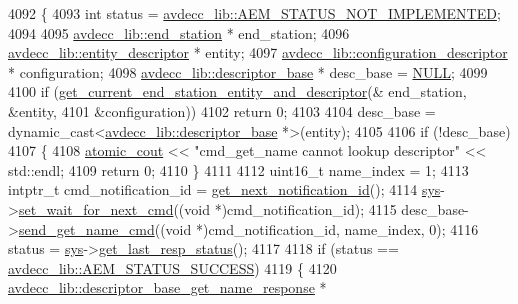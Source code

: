 \begin{DoxyCode}
4092 \{
4093     \textcolor{keywordtype}{int} status = \hyperlink{namespaceavdecc__lib_affd436edb2cecd20cfd784a84f852b2ba1de0a38d458af43bc8965b715fd37b4f}{avdecc\_lib::AEM\_STATUS\_NOT\_IMPLEMENTED};
4094 
4095     \hyperlink{classavdecc__lib_1_1end__station}{avdecc\_lib::end\_station} * end\_station;
4096     \hyperlink{classavdecc__lib_1_1entity__descriptor}{avdecc\_lib::entity\_descriptor} * entity;
4097     \hyperlink{classavdecc__lib_1_1configuration__descriptor}{avdecc\_lib::configuration\_descriptor} * configuration;
4098     \hyperlink{classavdecc__lib_1_1descriptor__base}{avdecc\_lib::descriptor\_base} * desc\_base = \hyperlink{openavb__types__base__pub_8h_a070d2ce7b6bb7e5c05602aa8c308d0c4}{NULL};
4099 
4100     \textcolor{keywordflow}{if} (\hyperlink{classcmd__line_ac2d4611fba7db03d436a2e3c1e64828e}{get\_current\_end\_station\_entity\_and\_descriptor}(&
      end\_station, &entity,
4101                                                       &configuration))
4102         \textcolor{keywordflow}{return} 0;
4103 
4104     desc\_base = \textcolor{keyword}{dynamic\_cast<}\hyperlink{classavdecc__lib_1_1descriptor__base}{avdecc\_lib::descriptor\_base} *\textcolor{keyword}{>}(entity);
4105 
4106     \textcolor{keywordflow}{if} (!desc\_base)
4107     \{
4108         \hyperlink{cmd__line_8h_a0bc38ccc65c79ba06c6fcd7b4bf554c3}{atomic\_cout} << \textcolor{stringliteral}{"cmd\_get\_name cannot lookup descriptor"} << std::endl;
4109         \textcolor{keywordflow}{return} 0;
4110     \}
4111 
4112     uint16\_t name\_index = 1;
4113     intptr\_t cmd\_notification\_id = \hyperlink{classcmd__line_a57486218387d1aa9d262eb7c176154ad}{get\_next\_notification\_id}();
4114     \hyperlink{classcmd__line_a485db4800e331cb4052c447fdf5d154e}{sys}->\hyperlink{classavdecc__lib_1_1system_a26b769584f10225077da47583edda33e}{set\_wait\_for\_next\_cmd}((\textcolor{keywordtype}{void} *)cmd\_notification\_id);
4115     desc\_base->\hyperlink{classavdecc__lib_1_1descriptor__base_a27ba9959456de53a8de18eead74806f7}{send\_get\_name\_cmd}((\textcolor{keywordtype}{void} *)cmd\_notification\_id, name\_index, 0);
4116     status = \hyperlink{classcmd__line_a485db4800e331cb4052c447fdf5d154e}{sys}->\hyperlink{classavdecc__lib_1_1system_aa63e8d1a4e51f695cdcccc9340922407}{get\_last\_resp\_status}();
4117 
4118     \textcolor{keywordflow}{if} (status == \hyperlink{namespaceavdecc__lib_affd436edb2cecd20cfd784a84f852b2bac947077909cb590b84f4b5db413080e0}{avdecc\_lib::AEM\_STATUS\_SUCCESS})
4119     \{
4120         \hyperlink{classavdecc__lib_1_1descriptor__base__get__name__response}{avdecc\_lib::descriptor\_base\_get\_name\_response} * 

\end{DoxyCode}
